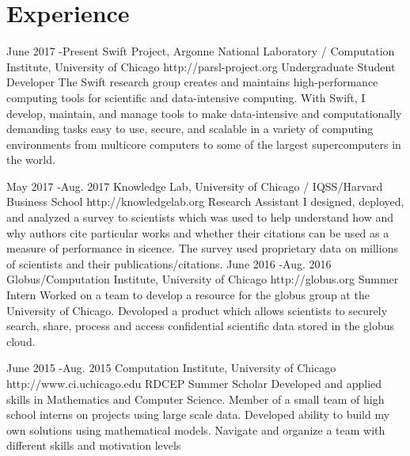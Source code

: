 \documentclass[10pt]{article} %
\begin{document}

\section{Experience}
\job
{June 2017 -}{Present}
{Swift Project, Argonne National Laboratory / Computation Institute, University of Chicago}
{http://parsl-project.org}
{Undergraduate Student Developer}
{The Swift research group creates and maintains high-performance computing tools for scientific and data-intensive computing. With Swift, I develop, maintain, and manage tools to make data-intensive and computationally demanding tasks easy to use, secure, and scalable in a variety of computing environments from multicore computers to some of the largest supercomputers in the world.}


\job
{May 2017 -}{Aug. 2017}
{Knowledge Lab, University of Chicago / IQSS/Harvard Business School}
{http://knowledgelab.org}
{Research Assistant}
{I designed, deployed, and analyzed a survey to scientists which was used to help understand how and why authors cite particular works and whether their citations can be used as a measure of performance in sicence. The survey used proprietary data on millions of scientists and their publications/citations.}
\job
{June 2016 -}{Aug. 2016}
{Globus/Computation Institute, University of Chicago}
{http://globus.org}
{Summer Intern}
{Worked on a team to develop a resource for the globus group at the University of Chicago. Devoloped a product which allows scientists to securely search, share, process and access confidential scientific data stored in the globus cloud.}

\job
{June 2015 -}{Aug. 2015}
{Computation Institute, University of Chicago}
{http://www.ci.uchicago.edu}
{RDCEP Summer Scholar}
{Developed and applied skills in Mathematics and Computer Science. Member of a small team of high school interns on projects using large scale data.   Developed ability to build my own solutions using mathematical models.  Navigate and organize a team with different skills and motivation levels}

\end{document}
